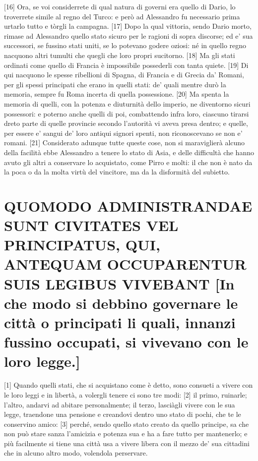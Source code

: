 {[}16{]} Ora, se voi considerrete di qual natura di governi era quello
di Dario, lo troverrete simile al regno del Turco: e però ad Alessandro
fu necessario prima urtarlo tutto e tòrgli la campagna. {[}17{]} Dopo la
qual vittoria, sendo Dario morto, rimase ad Alessandro quello stato
sicuro per le ragioni di sopra discorse; ed e' sua successori, se
fussino stati uniti, se lo potevano godere oziosi: né in quello regno
nacquono altri tumulti che quegli che loro propri sucitorno. {[}18{]} Ma
gli stati ordinati come quello di Francia è impossibile possederli con
tanta quiete. {[}19{]} Di qui nacquono le spesse ribellioni di Spagna,
di Francia e di Grecia da' Romani, per gli spessi principati che erano
in quelli stati: de' quali mentre durò la memoria, sempre fu Roma
incerta di quella possessione. {[}20{]} Ma spenta la memoria di quelli,
con la potenza e diuturnità dello imperio, ne diventorno sicuri
possessori: e poterno anche quelli di poi, combattendo infra loro,
ciascuno tirarsi dreto parte di quelle provincie secondo l'autorità vi
aveva presa dentro; e quelle, per essere e' sangui de' loro antiqui
signori spenti, non riconoscevano se non e' romani. {[}21{]} Considerato
adunque tutte queste cose, non si maraviglierà alcuno della facilità
ebbe Alessandro a tenere lo stato di Asia, e delle difficultà che hanno
avuto gli altri a conservare lo acquistato, come Pirro e molti: il che
non è nato da la poca o da la molta virtù del vincitore, ma da la
disformità del subietto.

\quebra\section{QUOMODO ADMINISTRANDAE SUNT CIVITATES VEL PRINCIPATUS, QUI, ANTEQUAM
OCCUPARENTUR SUIS LEGIBUS VIVEBANT
{[}In che modo si debbino governare le città o principati li quali,
innanzi fussino occupati, si vivevano con le loro legge.{]}}

{[}1{]} Quando quelli stati, che si acquistano come è detto, sono
consueti a vivere con le loro leggi e in libertà, a volergli tenere ci
sono tre modi: {[}2{]} il primo, ruinarle; l'altro, andarvi ad abitare
personalmente; il terzo, lasciàgli vivere con le sua legge, traendone
una pensione e creandovi dentro uno stato di pochi, che te le conservino
amico: {[}3{]} perché, sendo quello stato creato da quello principe, sa
che non può stare sanza l'amicizia e potenza sua e ha a fare tutto per
mantenerlo; e più facilmente si tiene una città usa a vivere libera con
il mezzo de' sua cittadini che in alcuno altro modo, volendola
perservare.

